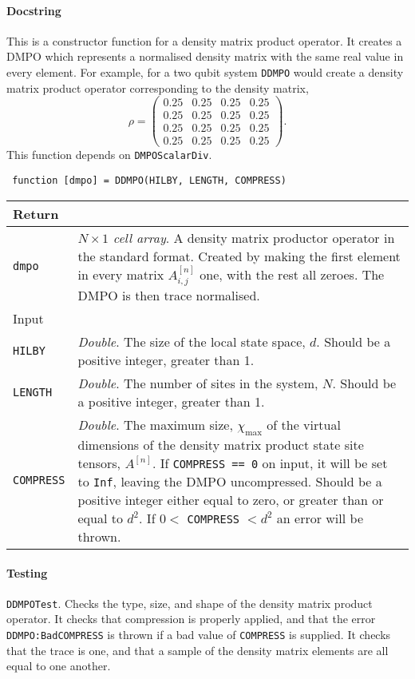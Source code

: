  \paragraph{Docstring} This is a constructor function for a density matrix product operator. It creates a DMPO which represents a normalised density matrix with the same real value in every element. For example, for a two qubit system \lstinline$DDMPO$ would create a density matrix product operator corresponding to the density matrix,
 \begin{equation}
 \rho = \begin{pmatrix}
 0.25 & 0.25 & 0.25 & 0.25 \\
 0.25 & 0.25 & 0.25 & 0.25 \\
 0.25 & 0.25 & 0.25 & 0.25 \\
 0.25 & 0.25 & 0.25 & 0.25 \end{pmatrix}.
 \label{eq:vs3-4}
 \end{equation} 
 This function depends on \lstinline$DMPOScalarDiv$.
 \begin{lstlisting}
 function [dmpo] = DDMPO(HILBY, LENGTH, COMPRESS) \end{lstlisting}
 \begin{longtabu}{X[1,l]X[4,l]}
 \hline
 Return & \\ \hline
 \lstinline$dmpo$ & \emph{\(N \times 1\) cell array}. A density matrix productor operator in the standard format. Created by making the first element in every matrix \(A^{[n]}_{i,j}\) one, with the rest all zeroes. The DMPO is then trace normalised.  \\ \hline
 Input & \\ \hline
 \lstinline$HILBY$ & \emph{Double}. The size of the local state space, \(d\). Should be a positive integer, greater than 1. \\
 \lstinline$LENGTH$ & \emph{Double}. The number of sites in the system, \(N\). Should be a positive integer, greater than 1. \\
 \lstinline$COMPRESS$ & \emph{Double}. The maximum size, \(\chi_{\mathrm{max}}\) of the virtual dimensions of the density matrix product state site tensors, \(A^{[n]}\). If \lstinline$COMPRESS == 0$ on input, it will be set to \lstinline$Inf$, leaving the DMPO uncompressed. Should be a positive integer either equal to zero, or greater than or equal to \(d^{2}\). If \(0 <\) \lstinline$COMPRESS$ \(< d^{2}\) an error will be thrown. \\
 \hline
 \end{longtabu}  
 \paragraph{Testing} \lstinline$DDMPOTest$. Checks the type, size, and shape of the density matrix product operator. It checks that compression is properly applied, and that the error \lstinline$DDMPO:BadCOMPRESS$ is thrown if a bad value of \lstinline$COMPRESS$ is supplied. It checks that the trace is one, and that a sample of the density matrix elements are all equal to one another. 
 
